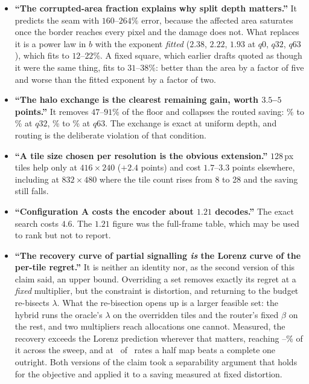 \begin{itemize}\itemsep3pt
\item \textbf{``The corrupted-area fraction explains why split depth matters.''}
      It predicts the seam with $160$--$264\%$ error, because the affected area
      saturates once the border reaches every pixel and the damage does not. What
      replaces it is a power law in $b$ with the exponent \emph{fitted}
      ($2.38$, $2.22$, $1.93$ at $q0$, $q32$, $q63$), which fits to
      $12$--$22\%$. A fixed square, which earlier drafts quoted as though it
      were the same thing, fits to $31$--$38\%$: better than the area by a
      factor of five and worse than the fitted exponent by a factor of two.
\item \textbf{``The halo exchange is the clearest remaining gain, worth
      $3.5$--$5$ points.''} It removes $47$--$91\%$ of the floor and collapses the
      routed saving: \CoupPaddedMid\% to \CoupCoupledMid\% at $q32$,
      \CoupPaddedHigh\% to \CoupCoupledHigh\% at
      $q63$. The exchange is exact at uniform depth, and routing is the deliberate
      violation of that condition.
\item \textbf{``A tile size chosen per resolution is the obvious extension.''}
      $128$\,px tiles help only at $416{\times}240$ ($+2.4$ points) and cost
      $1.7$--$3.3$ points elsewhere, including at $832{\times}480$ where the tile
      count rises from 8 to 28 and the saving still falls.
\item \textbf{``Configuration A costs the encoder about $1.21$ decodes.''} The
      exact search costs $4.6$. The $1.21$ figure was the full-frame table, which
      may be used to rank but not to report.
\item \textbf{``The recovery curve of partial signalling \emph{is} the Lorenz
      curve of the per-tile regret.''} It is neither an identity nor, as the
      second version of this claim said, an upper bound. Overriding a set
      removes exactly its regret at a \emph{fixed} multiplier, but the
      constraint is distortion, and returning to the budget re-bisects
      $\lambda$. What the re-bisection opens up is a larger feasible set: the
      hybrid runs the oracle's $\lambda$ on the overridden tiles and the
      router's fixed $\beta$ on the rest, and two multipliers reach allocations
      one cannot. Measured, the recovery exceeds the Lorenz prediction wherever
      that matters, reaching \LorenzTightMin--\LorenzTightMax\% of it across
      the sweep, and at \HybridBeatsAN\ of \HybridBeatsAOf\ rates a half map
      beats a complete one outright. Both versions of the claim took a
      separability argument that holds for the objective and applied it to a
      saving measured at fixed distortion.
\end{itemize}

